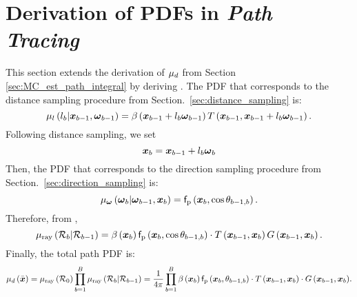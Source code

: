 \documentclass{article}
\begin{document}
\section{Derivation of \ac{PDF}s in {\em Path Tracing}}
This section extends the derivation of $\mu_{d}$ from Section \ref{sec:MC_est_path_integral} by deriving \eq{\ref{eq:final_mu}}. 
\label{sec:ptpdf}
The \ac{PDF} that corresponds to the distance sampling procedure from Section.~\ref{sec:distance_sampling} is:
\begin{equation}
    \mu_{l}\left({l_{b}|\boldsymbol{x}_{b-1},\boldsymbol{\omega}_{b-1}}\right)  = \beta\left({\boldsymbol{x}_{b-1}+l_{b}\boldsymbol{\omega}_{b-1}}\right) T\left({{\boldsymbol{x}_{b-1}},{\boldsymbol{x}_{b-1}+l_{b}\boldsymbol{\omega}_{b-1}}}\right).
\end{equation}
Following distance sampling, we set 
\begin{equation}
\label{eq:dist_set_app}
    \boldsymbol{x}_{b}=\boldsymbol{x}_{b-1} + l_{b}\boldsymbol{\omega}_{b}
\end{equation}
Then, the \ac{PDF} that corresponds to the direction sampling procedure
from Section.~\ref{sec:direction_sampling} is: 
\begin{equation}
    \mu_{\boldsymbol{\omega}}\left({\boldsymbol{\omega}_{b}|\boldsymbol{\omega}_{b-1},\boldsymbol{x}_{b}}\right)  = \mathsf{f}_{\text{p}}\left({\boldsymbol{x}_{b},\cos\theta_{b-1,b}}\right).
\end{equation}
Therefore, from \eqs{\ref{eq:geomterm},\ref{eq:semgent_sampling},\ref{eq:dist_set_app}},
\begin{equation}
\mu_{\text{ray}}\left({\mathcal{R}_{b}|\mathcal{R}_{b-1}}\right) = \beta\left({\boldsymbol{x}_{b}}\right)\mathsf{f}_{\text{p}}\left({\boldsymbol{x}_{b},\cos\theta_{b-1,b}}\right)\cdot  T\left({{\boldsymbol{x}_{b-1}},{\boldsymbol{x}_{b}}}\right)G\left({\boldsymbol{x}_{b-1},\boldsymbol{x}_{b}}\right).
\end{equation}
Finally, the total path \ac{PDF} is:
\begin{equation}
\label{eq:final_mu_app}
\mu_{d}\left({\Bar{\boldsymbol{x}}}\right) =\mu_{\text{ray}}\left({\mathcal{R}_0}\right)\prod_{b=1}^{B}{\mu_{\text{ray}}\left({\mathcal{R}_{b}|\mathcal{R}_{b-1}}\right)}=\frac{1}{4\pi}\prod_{b=1}^{B}{\beta\left({\boldsymbol{x}_{b}}\right)\mathsf{f}_{\text{p}}\left({\boldsymbol{x}_{b},\theta_{b-1,b}}\right) \cdot T\left({{\boldsymbol{x}_{b-1}},{\boldsymbol{x}_{b}}}\right)\cdot G\left({\boldsymbol{x}_{b-1},\boldsymbol{x}_{b}}\right)}.
\end{equation}
\end{document}

